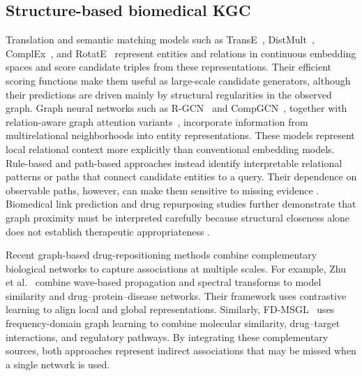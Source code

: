 \documentclass[pdflatex,sn-mathphys-num]{sn-jnl}
\begin{document}
\subsection{Structure-based biomedical KGC}

Translation and semantic matching models such as TransE~\citep{bordes2013translating}, DistMult~\citep{yang2014embedding}, ComplEx~\citep{trouillon2016complex}, and RotatE~\citep{sunrotate} represent entities and relations in continuous embedding spaces and score candidate triples from these representations. Their efficient scoring functions make them useful as large-scale candidate generators, although their predictions are driven mainly by structural regularities in the observed graph. Graph neural networks such as R-GCN~\citep{schlichtkrull2018modeling} and CompGCN~\citep{vashishthcomposition}, together with relation-aware graph attention variants~\citep{sheikh2021knowledge}, incorporate information from multirelational neighborhoods into entity representations. These models represent local relational context more explicitly than conventional embedding models. Rule-based and path-based approaches instead identify interpretable relational patterns or paths that connect candidate entities to a query. Their dependence on observable paths, however, can make them sensitive to missing evidence \citep{yang2017differentiable,meilicke2019anytime,cheng2023neural}. Biomedical link prediction and drug repurposing studies further demonstrate that graph proximity must be interpreted carefully because structural closeness alone does not establish therapeutic appropriateness \citep{himmelstein2017systematic,sadegh2020exploring,ashburn2004drug,pushpakom2019drug}.


\begin{revisionblock}
Recent graph-based drug-repositioning methods combine complementary biological networks to capture associations at multiple scales. For example, Zhu et al.~\citep{zhu2026spatialspectral} combine wave-based propagation and spectral transforms to model similarity and drug--protein--disease networks. Their framework uses contrastive learning to align local and global representations. Similarly, FD-MSGL~\citep{zhu2026fdmsgl} uses frequency-domain graph learning to combine molecular similarity, drug--target interactions, and regulatory pathways. By integrating these complementary sources, both approaches represent indirect associations that may be missed when a single network is used.
\end{revisionblock}
\end{document}
